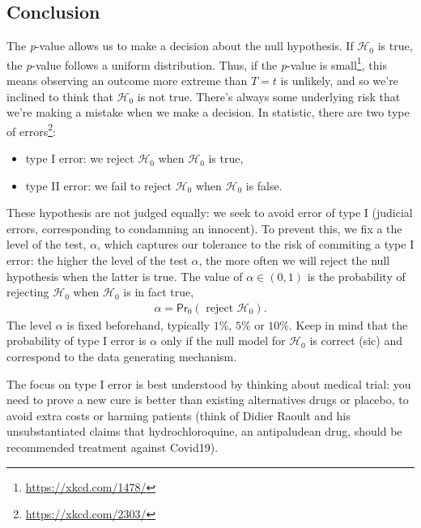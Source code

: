 \documentclass[
  11pt,
  letterpaper,
]{book}
\providecommand{\tightlist}{%
  \setlength{\itemsep}{0pt}\setlength{\parskip}{0pt}}
\renewcommand{\href}[2]{#2\footnote{\url{#1}}}
\theoremstyle{definition}
\theoremstyle{definition}
\theoremstyle{definition}
\theoremstyle{definition}
\theoremstyle{remark}
\begin{document}
\hypertarget{conclusion}{%
\subsection{Conclusion}\label{conclusion}}

The \emph{p}-value allows us to make a decision about the null hypothesis. If \(\mathscr{H}_0\) is true, the \emph{p}-value follows a uniform distribution. \href{https://xkcd.com/1478/}{Thus, if the \emph{p}-value is small}, this means observing an outcome more extreme than \(T=t\) is unlikely, and so we're inclined to think that \(\mathscr{H}_0\) is not true. There's always some underlying risk that we're making a mistake when we make a decision. In statistic, there are \href{https://xkcd.com/2303/}{two type of errors}:

\begin{itemize}
\tightlist
\item
  type I error: we reject \(\mathscr{H}_0\) when \(\mathscr{H}_0\) is true,
\item
  type II error: we fail to reject \(\mathscr{H}_0\) when \(\mathscr{H}_0\) is false.
\end{itemize}

These hypothesis are not judged equally: we seek to avoid error of type I (judicial errors, corresponding to condamning an innocent). To prevent this, we fix a the level of the test, \(\alpha\), which captures our tolerance to the risk of commiting a type I error: the higher the level of the test \(\alpha\), the more often we will reject the null hypothesis when the latter is true. The value of \(\alpha \in (0, 1)\) is the probability of rejecting \(\mathscr{H}_0\) when \(\mathscr{H}_0\) is in fact true,
\begin{align*}
\alpha = \mathsf{Pr}_0\left(\text{ reject } \mathscr{H}_0\right).
\end{align*}
The level \(\alpha\) is fixed beforehand, typically \(1\)\%, \(5\)\% or \(10\)\%. Keep in mind that the probability of type I error is \(\alpha\) only if the null model for \(\mathscr{H}_0\) is correct (sic) and correspond to the data generating mechanism.

The focus on type I error is best understood by thinking about medical trial: you need to prove a new cure is better than existing alternatives drugs or placebo, to avoid extra costs or harming patients (think of Didier Raoult and his unsubstantiated claims that hydrochloroquine, an antipaludean drug, should be recommended treatment against Covid19).
\end{document}
